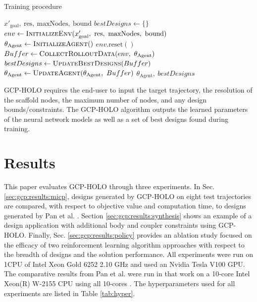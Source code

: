\begin{algorithm}[H]
\caption{Training procedure}
\label{alg:training_procedure}
\begin{algorithmic}[1]
\Require $x'_{\text{goal}},\ \text{res},\ \text{maxNodes},\ \text{bound}$ 
\State $bestDesigns \gets \{\}$ 
\State $env \gets \textsc{InitializeEnv}(x'_{\text{goal}},\ \text{res},\ \text{maxNodes},\ \text{bound})$ 
\State $\theta_{\text{Agent}} \gets \textsc{InitializeAgent}()$ 
    \State $env.\text{reset}()$ 
    \State $Buffer \gets \textsc{CollectRolloutData}(env,\ \theta_{\text{Agent}})$ 
    \State $bestDesigns \gets \textsc{UpdateBestDesigns}(Buffer)$ 
            \State $\theta_{\text{Agent}} \gets \textsc{UpdateAgent}(\theta_{\text{Agent}},\ Buffer)$
        \EndFor
    \EndIf
\EndFor
\State \Return $\theta_{\text{Agent}},\ bestDesigns$
\end{algorithmic}
\end{algorithm}

GCP-HOLO requires the end-user to input the target trajectory, the resolution of the scaffold nodes, the maximum number of nodes, and any design bounds/constraints. The GCP-HOLO algorithm outputs the learned parameters of the neural network models as well as a set of best designs found during training.

\section{Results}\label{sec:gcp:results}
This paper evaluates GCP-HOLO through three experiments. In Sec. \ref{sec:gcp:results:micp}, designs generated by GCP-HOLO on eight test trajectories are compared, with respect to objective value and computation time, to designs generated by Pan et al. \cite{pan_joint_2022}. Section \ref{sec:gcp:results:synthesis} shows an example of a design application with additional body and coupler constraints using GCP-HOLO. Finally, Sec. \ref{sec:gcp:results:policy} provides an ablation study focused on the efficacy of two reinforcement learning algorithm approaches with respect to the breadth of designs and the solution performance. All experiments were run on 1CPU of Intel Xeon Gold 6252 2.10 GHz and used an Nvidia Tesla V100 GPU. The comparative results from Pan et al. were run in that work on a 10-core Intel Xeon(R) W-2155 CPU using all 10-cores \cite{pan_joint_2022}. The hyperparameters used for all experiments are listed in Table \ref{tab:hyper}.


